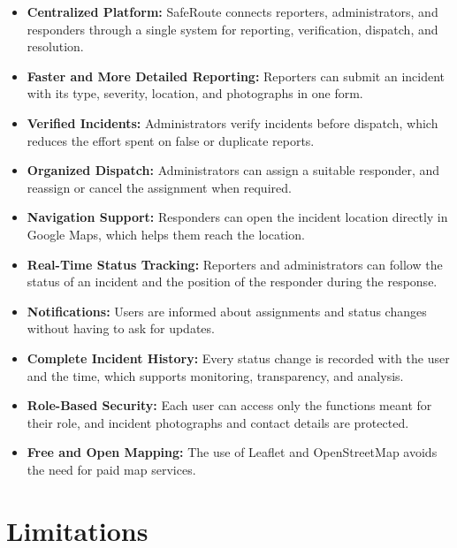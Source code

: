 \documentclass[a4paper,12pt]{report}
\begin{document}
	\begin{itemize}
		\item \textbf{Centralized Platform:}
		SafeRoute connects reporters, administrators, and responders through a single system for reporting, verification, dispatch, and resolution.
		
		\item \textbf{Faster and More Detailed Reporting:}
		Reporters can submit an incident with its type, severity, location, and photographs in one form.
		
		\item \textbf{Verified Incidents:}
		Administrators verify incidents before dispatch, which reduces the effort spent on false or duplicate reports.
		
		\item \textbf{Organized Dispatch:}
		Administrators can assign a suitable responder, and reassign or cancel the assignment when required.
		
		\item \textbf{Navigation Support:}
		Responders can open the incident location directly in Google Maps, which helps them reach the location.
		
		\item \textbf{Real-Time Status Tracking:}
		Reporters and administrators can follow the status of an incident and the position of the responder during the response.
		
		\item \textbf{Notifications:}
		Users are informed about assignments and status changes without having to ask for updates.
		
		\item \textbf{Complete Incident History:}
		Every status change is recorded with the user and the time, which supports monitoring, transparency, and analysis.
		
		\item \textbf{Role-Based Security:}
		Each user can access only the functions meant for their role, and incident photographs and contact details are protected.
		
		\item \textbf{Free and Open Mapping:}
		The use of Leaflet and OpenStreetMap avoids the need for paid map services.
	\end{itemize}
	
	\newpage
	
	\section{Limitations}
	
\end{document}
